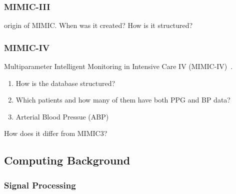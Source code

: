 \documentclass[12pt, bibliography=totoc]{scrartcl}
\begin{document}
\subsubsection{MIMIC-III}

origin of MIMIC\@.
When was it created?
How is it structured?

\subsubsection{MIMIC-IV}

Multiparameter Intelligent Monitoring in Intensive Care IV (MIMIC-IV)~\cite{johnson_mimic-iv_2023}.

\begin{enumerate}
        \item How is the database structured?
\item Which patients and how many of them have both PPG and BP data?
\item Arterial Blood Pressue (ABP)
\end{enumerate}

How does it differ from MIMIC3?

\subsection{Computing Background}

\subsubsection{Signal Processing}
\end{document}
